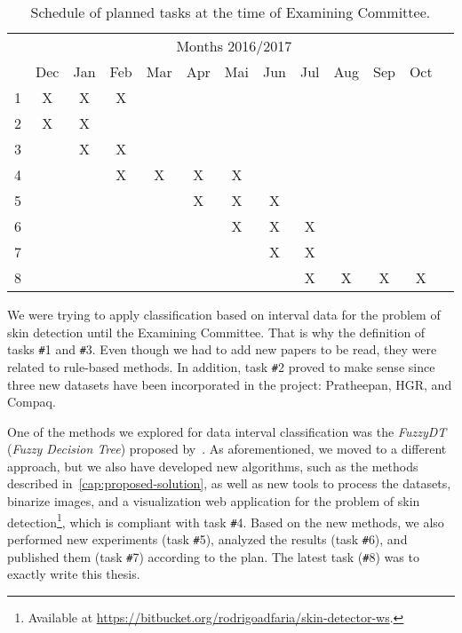 \begin{table}[!htpb]
\centering

\setlength{\tabcolsep}{6pt} 

\begin{tabular}{|c|c|c|c|c|c|c|c|c|c|c|c|c|}\hline
 & \multicolumn{11}{c|}{Months 2016/2017}\\ \cline{2-12}
\raisebox{1.5ex}{Task} & Dec & Jan & Feb & Mar & Apr & Mai & Jun & Jul & Aug & Sep & Oct \\ \hline

1 & X & X & X &   &   &   &   &   &   &   & \\ \hline
2 & X & X &   &   &   &   &   &   &   &   & \\ \hline
3 &   & X & X &   &   &   &   &   &   &   & \\ \hline
4 &   &   & X & X & X & X &   &   &   &   & \\ \hline
5 &   &   &   &   & X & X & X &   &   &   & \\ \hline
6 &   &   &   &   &   & X & X & X &   &   & \\ \hline
7 &   &   &   &   &   &   & X & X &   &   & \\ \hline
8 &   &   &   &   &   &   &   & X & X & X & X \\ \hline

\end{tabular} 
\caption{Schedule of planned tasks at the time of Examining Committee.}
\label{tab:schedule}
\end{table}

We were trying to apply classification based on interval data for the problem of skin detection until the Examining Committee. That is why the definition of tasks \texttt{\#}1 and \texttt{\#}3. Even though we had to add new papers to be read, they were related to rule-based methods. In addition, task \texttt{\#}2 proved to make sense since three new datasets have been incorporated in the project: Pratheepan, HGR, and Compaq.

One of the methods we explored for data interval classification was the \emph{FuzzyDT} (\emph{Fuzzy Decision Tree}) proposed by~\citet{cintra:13}. As aforementioned, we moved to a different approach, but we also have developed new algorithms, such as the methods described in~\ref{cap:proposed-solution}, as well as new tools to process the datasets, binarize images, and a visualization web application for the problem of skin detection\footnote{Available at \url{https://bitbucket.org/rodrigoadfaria/skin-detector-ws}.}, which is compliant with task \texttt{\#}4. Based on the new methods, we also performed new experiments (task \texttt{\#}5), analyzed the results (task \texttt{\#}6), and published them (task \texttt{\#}7) according to the plan. The latest task (\texttt{\#}8) was to exactly write this thesis.

